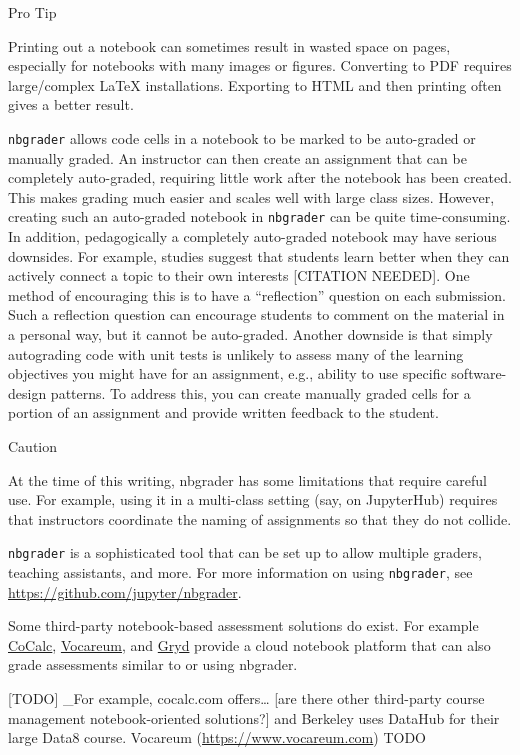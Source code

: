 \documentclass[]{book}
\let\BeginKnitrBlock\begin \let\EndKnitrBlock\end
\begin{document}
\BeginKnitrBlock{rmdnote}
Pro Tip

Printing out a notebook can sometimes result in wasted space on pages,
especially for notebooks with many images or figures. Converting to
PDF requires large/complex LaTeX installations. Exporting to HTML and
then printing often gives a better result.
\EndKnitrBlock{rmdnote}

\texttt{nbgrader} allows code cells in a notebook to be marked to be
auto-graded or manually graded. An instructor can then create an
assignment that can be completely auto-graded, requiring little work
after the notebook has been created. This makes grading much easier
and scales well with large class sizes. However, creating such an
auto-graded notebook in \texttt{nbgrader} can be quite time-consuming. In
addition, pedagogically a completely auto-graded notebook may have
serious downsides. For example, studies suggest that students learn
better when they can actively connect a topic to their own interests
{[}CITATION NEEDED{]}. One method of encouraging this is to have a
``reflection'' question on each submission. Such a reflection question
can encourage students to comment on the material in a personal way,
but it cannot be auto-graded. Another downside is that simply
autograding code with unit tests is unlikely to assess many of the
learning objectives you might have for an assignment, e.g., ability to
use specific software-design patterns. To address this, you can create
manually graded cells for a portion of an assignment and provide
written feedback to the student.

\BeginKnitrBlock{rmdnote}
Caution

At the time of this writing, nbgrader has some limitations
that require careful use. For example, using it in a multi-class
setting (say, on JupyterHub) requires that instructors coordinate the
naming of assignments so that they do not collide.
\EndKnitrBlock{rmdnote}

\texttt{nbgrader} is a sophisticated tool that can be set up to allow multiple
graders, teaching assistants, and more. For more information on using
\texttt{nbgrader}, see \url{https://github.com/jupyter/nbgrader}.

Some third-party notebook-based assessment solutions do exist. For
example \href{www.cocalc.com}{CoCalc}, \href{www.vocareum.com}{Vocareum}, and \href{https://gryd.us}{Gryd}
provide a cloud notebook platform that can also grade assessments
similar to or using nbgrader.

{[}TODO{]} \_For example, cocalc.com offers\ldots{} {[}are there other third-party course
management notebook-oriented solutions?{]} and Berkeley uses DataHub for
their large Data8 course. Vocareum (\url{https://www.vocareum.com}) TODO
\end{document}
